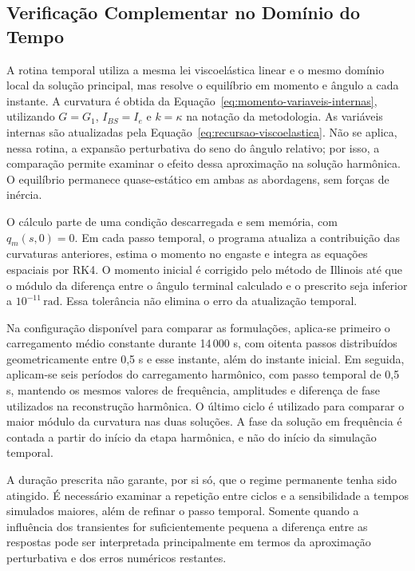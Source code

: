 \documentclass[arial,centeredequations,english,brazilian,oneside,section=TITLE]{ifes8}
\begin{document}
\subsection{Verificação Complementar no Domínio do Tempo}
\label{sec:verificacao-tempo-frequencia}

A rotina temporal utiliza a mesma lei viscoelástica linear e o mesmo domínio
local da solução principal, mas resolve o equilíbrio em momento e ângulo a
cada instante. A curvatura é obtida da
Equação~\eqref{eq:momento-variaveis-internas}, utilizando
$G=G_1$, $I_{BS}=I_e$ e $k=\kappa$ na notação da metodologia.
As variáveis internas são atualizadas pela
Equação~\eqref{eq:recursao-viscoelastica}. Não se aplica, nessa rotina,
a expansão perturbativa do seno do ângulo relativo; por isso, a comparação
permite examinar o efeito dessa aproximação na solução harmônica.
O equilíbrio permanece quase-estático em ambas as abordagens, sem forças de inércia.

O cálculo parte de uma condição descarregada e sem memória, com $q_m(s,0)=0$.
Em cada passo temporal, o programa atualiza a contribuição das curvaturas
anteriores, estima o momento no engaste e integra as equações espaciais por RK4.
O momento inicial é corrigido pelo método de Illinois até que o módulo
da diferença entre o ângulo terminal calculado e o prescrito seja inferior a
$10^{-11}\,\mathrm{rad}$. Essa tolerância não elimina o erro da atualização temporal.

Na configuração disponível para comparar as formulações, aplica-se primeiro
o carregamento médio constante durante 14\,000 s, com oitenta passos
distribuídos geometricamente entre 0,5 s e esse instante, além do instante inicial.
Em seguida, aplicam-se seis períodos do carregamento harmônico,
com passo temporal de 0,5 s, mantendo os mesmos valores de frequência, amplitudes
e diferença de fase utilizados na reconstrução harmônica.
O último ciclo é utilizado para comparar o maior módulo da curvatura nas duas
soluções. A fase da solução em frequência é contada a partir do início
da etapa harmônica, e não do início da simulação temporal.

A duração prescrita não garante, por si só, que o regime permanente tenha sido
atingido. É necessário examinar a repetição entre ciclos e a sensibilidade a
tempos simulados maiores, além de refinar o passo temporal. Somente quando a
influência dos transientes for suficientemente pequena a diferença entre as
respostas pode ser interpretada principalmente em termos da aproximação
perturbativa e dos erros numéricos restantes.
\end{document}
